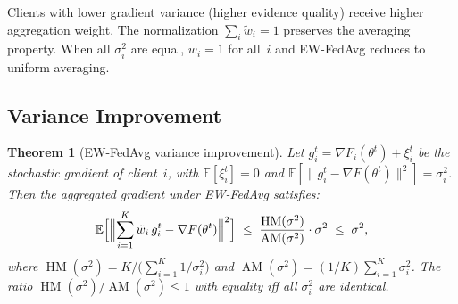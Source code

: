 \documentclass[11pt,a4paper]{article}
\newtheorem{theorem}{Theorem}[section]
\DeclareMathOperator{\AM}{AM}
\DeclareMathOperator{\HM}{HM}
\newcommand{\E}{\mathbb{E}}
\newcommand{\norm}[1]{\|#1\|}
\begin{document}
\noindent Clients with lower gradient variance (higher evidence quality)
receive higher aggregation weight. The normalization $\sum_i \tilde{w}_i = 1$
preserves the averaging property. When all $\sigma_i^2$ are equal, $w_i = 1$
for all~$i$ and EW-FedAvg reduces to uniform averaging.

\subsection{Variance Improvement}

\begin{theorem}[EW-FedAvg variance improvement]\label{thm:ew-variance}
Let $g_i^t = \nabla F_i(\theta^t) + \xi_i^t$ be the stochastic gradient of
client~$i$, with $\E[\xi_i^t] = 0$ and
$\E[\norm{g_i^t - \nabla F(\theta^t)}^2] = \sigma_i^2$. Then the aggregated
gradient under EW-FedAvg satisfies:
\begin{equation}\label{eq:ew-var-bound}
  \E\Bigl[\Bigl\|\sum_{i=1}^{K} \tilde{w}_i\, g_i^t - \nabla F(\theta^t)\Bigr\|^2\Bigr]
  \;\leq\; \frac{\HM(\sigma^2)}{\AM(\sigma^2)} \cdot \bar{\sigma}^2
  \;\leq\; \bar{\sigma}^2,
\end{equation}
where $\HM(\sigma^2) = K / \bigl(\sum_{i=1}^K 1/\sigma_i^2\bigr)$ and
$\AM(\sigma^2) = (1/K)\sum_{i=1}^K \sigma_i^2$. The ratio
$\HM(\sigma^2)/\AM(\sigma^2) \leq 1$ with equality iff all $\sigma_i^2$ are
identical.
\end{theorem}
\end{document}

